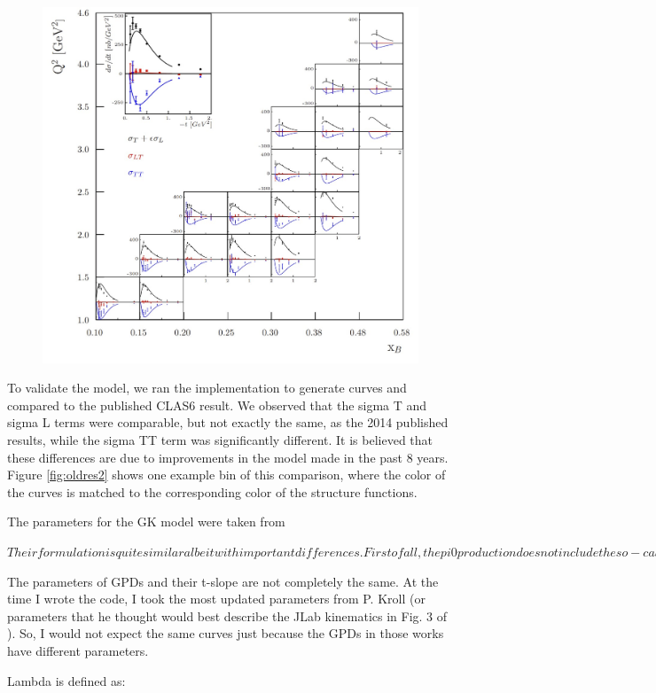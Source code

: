     \begin{figure}[hbt]
    	\centering
    	\includegraphics[page=6,width=0.6\linewidth]{Chapters/Ch5-Further/GK_model/pics/clas6comp.jpg}
    \end{figure}\label{fig:oldres}
    
    To validate the model, we ran the implementation to generate curves and compared to the published CLAS6 result. We observed that the sigma T and sigma L terms were comparable, but not exactly the same, as the 2014 published results, while the sigma TT term was significantly different. It is believed that these differences are due to improvements in the model made in the past 8 years. Figure \ref{fig:oldres2} shows one example bin of this comparison, where the color of the curves is matched to the corresponding color of the structure functions.
    
    
    The parameters for the GK model were taken from 
    
    $
    Their formulation is quite similar albeit with important differences. First of all, the pi0 production does not include the so-called pion-pole contribution (see Eq. 4.39 - 4.42 in my thesis). Moreover, their handbag contributions are slightly different. Their differences at the handbag level are discussed in Eq. 4.37 and 4.38 in my thesis. $
    
    The parameters of GPDs and their t-slope are not completely the same. At the time I wrote the code, I took the most updated parameters from P. Kroll (or parameters that he thought would best describe the JLab kinematics in Fig. 3 of \cite{Diehl2020ExtractionKinematics} ). So, I would not expect the same curves just because the GPDs in those works have different parameters. 
    
    Lambda is defined as: %
    
